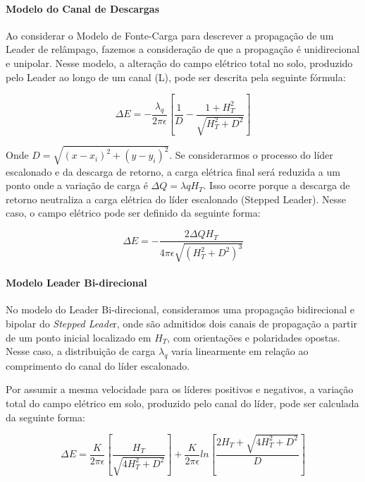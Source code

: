 \documentclass[a4paper, 12pt, onecolumn,singlespacing]{article}
\begin{document}
	\paragraph{Modelo do Canal de Descargas}
	
	Ao considerar o Modelo de Fonte-Carga para descrever a propagação de um Leader de relâmpago, fazemos a consideração de que a propagação é unidirecional e unipolar. Nesse modelo, a alteração do campo elétrico total no solo, produzido pelo Leader ao longo de um canal (L), pode ser descrita pela seguinte fórmula:
	
	\begin{equation}
		\Delta E = -\frac{\lambda_q}{2 \pi \epsilon} \left[\frac{1}{D} - \frac{1 + H_T^2}{\sqrt{H_T^2+D^2}}\right]
	\end{equation}

	Onde $D = \sqrt{\left(x - x_i\right)^2 + \left(y - y_i\right)^2}$. Se considerarmos o processo do líder escalonado e da descarga de retorno, a carga elétrica final será reduzida a um ponto onde a variação de carga é $ \Delta Q = \lambda qH_T$. Isso ocorre porque a descarga de retorno neutraliza a carga elétrica do líder escalonado (Stepped Leader). Nesse caso, o campo elétrico pode ser definido da seguinte forma:
	
	\begin{equation}
		\Delta E = -\frac{2 \Delta Q H_T}{4 \pi \epsilon \sqrt{\left(H_T^2 + D^2\right)^3}}
	\end{equation}
	
	\paragraph{Modelo Leader Bi-direcional} No modelo do Leader Bi-direcional, consideramos uma propagação bidirecional e bipolar do \textit{Stepped Leade}r, onde são admitidos dois canais de propagação a partir de um ponto inicial localizado em $H_T$, com orientações e polaridades opostas. Nesse caso, a distribuição de carga $\lambda_q$ varia linearmente em relação ao comprimento do canal do líder escalonado.
	
	Por assumir a mesma velocidade para os líderes positivos e negativos, a variação total do campo elétrico em solo, produzido pelo canal do líder, pode ser calculada da seguinte forma:
	
	\begin{equation}
		\Delta E = \frac{K}{2 \pi \epsilon} \left[\frac{H_T}{\sqrt{4H_T^2 + D^2}}\right] + \frac{K}{2 \pi \epsilon} ln \left[\frac{2H_T + \sqrt{4H_T^2 + D^2}}{D}\right]
	\end{equation}
\end{document}
